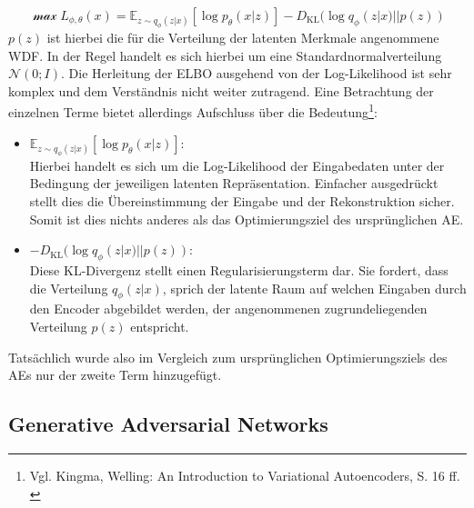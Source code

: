 \begin{equation}
    \mathcal \max L_{\phi, \theta}(x) = \mathbb E_{z \sim q_{\phi}(z|x)}
    \left [
        \log p_\theta(x|z)
    \right ]
    - D_\text{KL} (\log q_{\phi}(z|x) || p(z))
\end{equation}
$p(z)$ ist hierbei die für die Verteilung der latenten Merkmale angenommene \ac{WDF}. In der Regel handelt es sich hierbei um eine Standardnormalverteilung $\mathcal N(0; I)$. Die Herleitung der \ac{ELBO} ausgehend von der Log-Likelihood ist sehr komplex und dem Verständnis nicht weiter zutragend. Eine Betrachtung der einzelnen Terme bietet allerdings Aufschluss über die Bedeutung\footnote{
    Vgl. Kingma, Welling: An Introduction to Variational Autoencoders, S. 16 ff.
    \cite{Kingma_2019}
}:
\begin{itemize}
    \item $\mathbb E_{z \sim q_{\phi}(z|x)}
        \left [
            \log p_\theta(x|z)
        \right ]$: \\
    Hierbei handelt es sich um die Log-Likelihood der Eingabedaten unter der Bedingung der jeweiligen latenten Repräsentation. Einfacher ausgedrückt stellt dies die Übereinstimmung der Eingabe und der Rekonstruktion sicher. Somit ist dies nichts anderes als das Optimierungsziel des ursprünglichen \ac{AE}.

    \item $-D_\text{KL} (\log q_{\phi}(z|x) || p(z))$: \\
    Diese KL-Divergenz stellt einen Regularisierungsterm dar. Sie fordert, dass die Verteilung $q_{\phi}(z|x)$, sprich der latente Raum auf welchen Eingaben durch den Encoder abgebildet werden, der angenommenen zugrundeliegenden Verteilung $p(z)$ entspricht.
\end{itemize}
Tatsächlich wurde also im Vergleich zum ursprünglichen Optimierungsziels des \ac{AE}s nur der zweite Term hinzugefügt.


\subsection{Generative Adversarial Networks}

